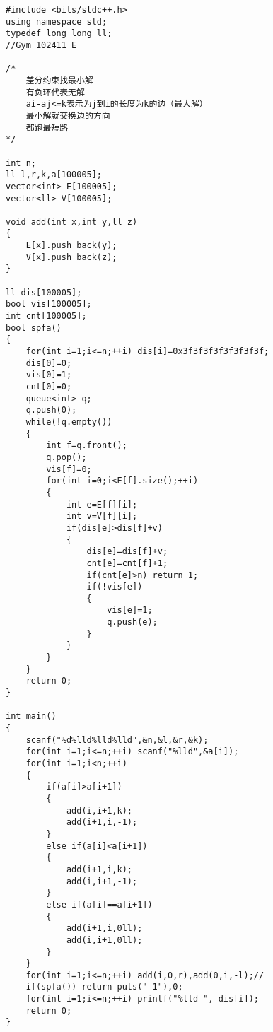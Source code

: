 \begin{lstlisting}
#include <bits/stdc++.h>
using namespace std;
typedef long long ll;
//Gym 102411 E

/*
	差分约束找最小解
	有负环代表无解
	ai-aj<=k表示为j到i的长度为k的边（最大解）
	最小解就交换边的方向
	都跑最短路
*/
 
int n;
ll l,r,k,a[100005];
vector<int> E[100005];
vector<ll> V[100005];
 
void add(int x,int y,ll z)
{
	E[x].push_back(y);
	V[x].push_back(z);
}
 
ll dis[100005];
bool vis[100005];
int cnt[100005];
bool spfa()
{
	for(int i=1;i<=n;++i) dis[i]=0x3f3f3f3f3f3f3f3f;
	dis[0]=0;
	vis[0]=1;
	cnt[0]=0;
	queue<int> q;
	q.push(0);
	while(!q.empty())
	{
		int f=q.front();
		q.pop();
		vis[f]=0;
		for(int i=0;i<E[f].size();++i)
		{
			int e=E[f][i];
			int v=V[f][i];
			if(dis[e]>dis[f]+v)
			{
				dis[e]=dis[f]+v;
				cnt[e]=cnt[f]+1;
				if(cnt[e]>n) return 1;
				if(!vis[e])
				{
					vis[e]=1;
					q.push(e);
				}
			}
		}
	}
	return 0;
}
 
int main()
{
	scanf("%d%lld%lld%lld",&n,&l,&r,&k);
	for(int i=1;i<=n;++i) scanf("%lld",&a[i]);
	for(int i=1;i<n;++i)
	{
		if(a[i]>a[i+1])
		{
			add(i,i+1,k);
			add(i+1,i,-1);
		}
		else if(a[i]<a[i+1])
		{
			add(i+1,i,k);
			add(i,i+1,-1);
		}
		else if(a[i]==a[i+1])
		{
			add(i+1,i,0ll);
			add(i,i+1,0ll);
		}
	}
	for(int i=1;i<=n;++i) add(i,0,r),add(0,i,-l);//
	if(spfa()) return puts("-1"),0;
	for(int i=1;i<=n;++i) printf("%lld ",-dis[i]);
	return 0;
}
\end{lstlisting}